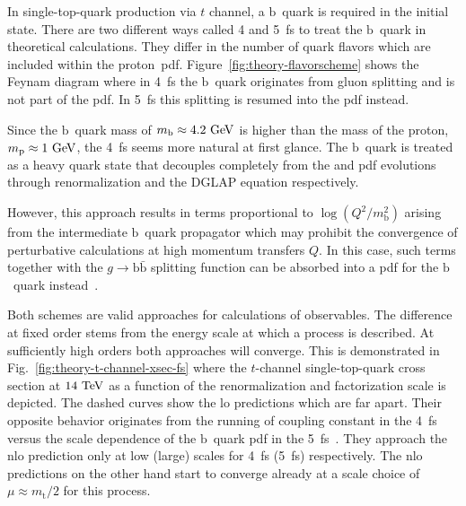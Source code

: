In single-top-quark production via $t$ channel, a $\mathrm{b}$~quark is required in the initial state. There are two different ways called 4 and 5~\gls{fs} to treat the $\mathrm{b}$~quark in theoretical calculations. They differ in the number of quark flavors which are included within the proton~\gls{pdf}. Figure~\ref{fig:theory-flavorscheme} shows the Feynam diagram where in 4~\gls{fs} the $\mathrm{b}$~quark originates from gluon splitting and is not part of the \gls{pdf}. In 5~\gls{fs} this splitting is resumed into the \gls{pdf} instead.


Since the $\mathrm{b}$~quark mass of $m_\mathrm{b}\approx4.2~\mathrm{GeV}$ is higher than the mass of the proton, $m_\mathrm{p}\approx1~\mathrm{GeV}$, the 4~\gls{fs} seems more natural at first glance. The $\mathrm{b}$~quark is treated as a heavy quark state that decouples completely from the \as and \gls{pdf} evolutions through renormalization and the DGLAP equation respectively.

However, this approach results in terms proportional to $\log(Q^2/m_\mathrm{b}^2)$ arising from the intermediate $\mathrm{b}$~quark propagator which may prohibit the convergence of perturbative calculations at high momentum transfers $Q$. In this case, such terms together with the $g\to\mathrm{b}\bar{\mathrm{b}}$ splitting function can be absorbed into a \gls{pdf} for the $\mathrm{b}$~quark instead~\cite{Maltoni:2012pa}.

Both schemes are valid approaches for calculations of observables. The difference at fixed order stems from the energy scale at which a process is described. At sufficiently high orders both approaches will converge. This is demonstrated in Fig.~\ref{fig:theory-t-channel-xsec-fs} where the $t$-channel single-top-quark cross section at $14~\mathrm{TeV}$ as a function of the renormalization and factorization scale is depicted. The dashed curves show the \gls{lo} predictions which are far apart. Their opposite behavior originates from the running of coupling constant \as in the 4~\gls{fs} versus the scale dependence of the $\mathrm{b}$~quark \gls{pdf} in the 5~\gls{fs}~\cite{Maltoni:2012pa}. They approach the \gls{nlo} prediction only at low (large) scales for 4~\gls{fs} (5~\gls{fs}) respectively. The \gls{nlo} predictions on the other hand start to converge already at a scale choice of $\mu\approx m_\mathrm{t}/2$ for this process.


